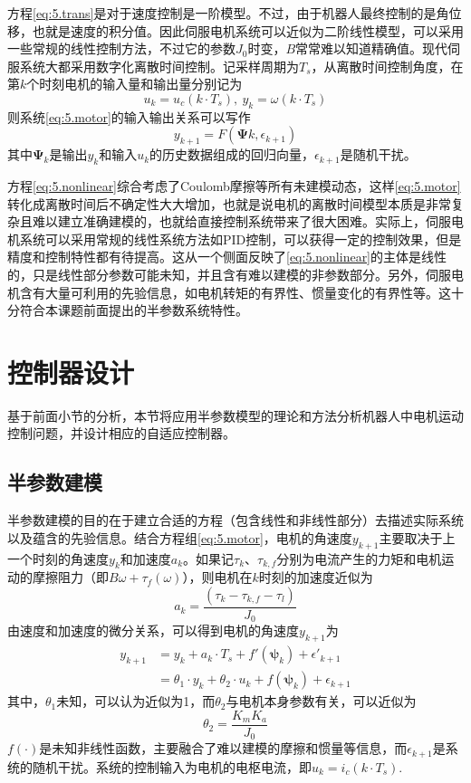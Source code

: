 方程\eqref{eq:5.trans}是对于速度控制是一阶模型。不过，由于机器人最终控制的是角位移，也就是速度的积分值。因此伺服电机系统可以近似为二阶线性模型，可以采用一些常规的线性控制方法，不过它的参数$J_{0}$时变，$B$常常难以知道精确值。现代伺服系统大都采用数字化离散时间控制。记采样周期为$T_{s}$，从离散时间控制角度，在第$k$个时刻电机的输入量和输出量分别记为
$$u_{k}=u_{c}(k\cdot T_{s}),\ y_{k}=\omega(k\cdot T_{s})$$
则系统\eqref{eq:5.motor}的输入输出关系可以写作
\begin{equation}\label{eq:5.nonlinear}
y_{k+1}=F(\bm{\Psi}{k},\epsilon_{k+1})
\end{equation}
其中$\bm{\Psi}_{k}$是输出$y_{k}$和输入$u_{k}$的历史数据组成的回归向量，$\epsilon_{k+1}$是随机干扰。

方程\eqref{eq:5.nonlinear}综合考虑了Coulomb摩擦等所有未建模动态，这样\eqref{eq:5.motor}转化成离散时间后不确定性大大增加，也就是说电机的离散时间模型本质是非常复杂且难以建立准确建模的，也就给直接控制系统带来了很大困难。实际上，伺服电机系统可以采用常规的线性系统方法如PID控制，可以获得一定的控制效果，但是精度和控制特性都有待提高。这从一个侧面反映了\eqref{eq:5.nonlinear}的主体是线性的，只是线性部分参数可能未知，并且含有难以建模的非参数部分。另外，伺服电机含有大量可利用的先验信息，如电机转矩的有界性、惯量变化的有界性等。这十分符合本课题前面提出的半参数系统特性。

\section{控制器设计}\label{chap:5.2}
基于前面小节的分析，本节将应用半参数模型的理论和方法分析机器人中电机运动控制问题，并设计相应的自适应控制器。
\subsection{半参数建模}\label{5.2.1}
半参数建模的目的在于建立合适的方程（包含线性和非线性部分）去描述实际系统以及蕴含的先验信息。结合方程组\eqref{eq:5.motor}，电机的角速度$y_{k+1}$主要取决于上一个时刻的角速度$y_{k}$和加速度$a_{k}$。如果记$\tau_{k}$、$\tau_{k,f}$分别为电流产生的力矩和电机运动的摩擦阻力（即$B \omega + \tau_{f}(\omega)$），则电机在$k$时刻的加速度近似为
$$a_{k}=\frac{(\tau_{k}-\tau_{k,f}-\tau_{l})}{J_{0}}$$
由速度和加速度的微分关系，可以得到电机的角速度$y_{k+1}$为
\begin{equation}\label{eq:5.yk1}
\begin{split}
y_{k+1}&=y_{k}+a_{k}\cdot T_{s}+f'(\bm{\psi}_{k})+\epsilon'_{k+1}\\
&=\theta_{1}\cdot y_{k}+\theta_{2}\cdot u_{k}+f(\bm{\psi}_{k})+\epsilon_{k+1}
\end{split}
\end{equation}
其中，$\theta_{1}$未知，可以认为近似为1，而$\theta_{2}$与电机本身参数有关，可以近似为
$$\theta_{2}=\frac{K_{m}K_{a}}{J_{0}}$$
$f(\cdot)$是未知非线性函数，主要融合了难以建模的摩擦和惯量等信息，而$\epsilon_{k+1}$是系统的随机干扰。系统的控制输入为电机的电枢电流，即$u_{k}=i_{c}(k\cdot T_{s})$.

